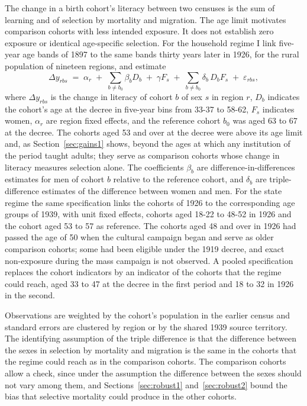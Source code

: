 The change in a birth cohort's literacy between two censuses is the sum of learning and of selection by mortality and migration. The age limit motivates comparison cohorts with less intended exposure. It does not establish zero exposure or identical age-specific selection. For the household regime I link five-year age bands of 1897 to the same bands thirty years later in 1926, for the rural population of nineteen regions, and estimate
\begin{equation}\label{eq:es1}
  \Delta y_{rbs} \;=\; \alpha_r \;+\; \sum_{b\neq b_0}\beta_b D_b \;+\; \gamma F_s \;+\; \sum_{b\neq b_0}\delta_b\, D_b F_s \;+\; \varepsilon_{rbs},
\end{equation}
where $\Delta y_{rbs}$ is the change in literacy of cohort $b$ of sex $s$ in region $r$, $D_b$ indicates the cohort's age at the decree in five-year bins from 33-37 to 58-62, $F_s$ indicates women, $\alpha_r$ are region fixed effects, and the reference cohort $b_0$ was aged 63 to 67 at the decree. The cohorts aged 53 and over at the decree were above its age limit and, as Section~\ref{sec:gains1} shows, beyond the ages at which any institution of the period taught adults; they serve as comparison cohorts whose change in literacy measures selection alone. The coefficients $\beta_b$ are difference-in-differences estimates for men of cohort $b$ relative to the reference cohort, and $\delta_b$ are triple-difference estimates of the difference between women and men. For the state regime the same specification links the cohorts of 1926 to the corresponding age groups of 1939, with unit fixed effects, cohorts aged 18-22 to 48-52 in 1926 and the cohort aged 53 to 57 as reference. The cohorts aged 48 and over in 1926 had passed the age of 50 when the cultural campaign began and serve as older comparison cohorts; some had been eligible under the 1919 decree, and exact non-exposure during the mass campaign is not observed. A pooled specification replaces the cohort indicators by an indicator of the cohorts that the regime could reach, aged 33 to 47 at the decree in the first period and 18 to 32 in 1926 in the second.

Observations are weighted by the cohort's population in the earlier census and standard errors are clustered by region or by the shared 1939 source territory. The identifying assumption of the triple difference is that the difference between the sexes in selection by mortality and migration is the same in the cohorts that the regime could reach as in the comparison cohorts. The comparison cohorts allow a check, since under the assumption the difference between the sexes should not vary among them, and Sections~\ref{sec:robust1} and~\ref{sec:robust2} bound the bias that selective mortality could produce in the other cohorts.

